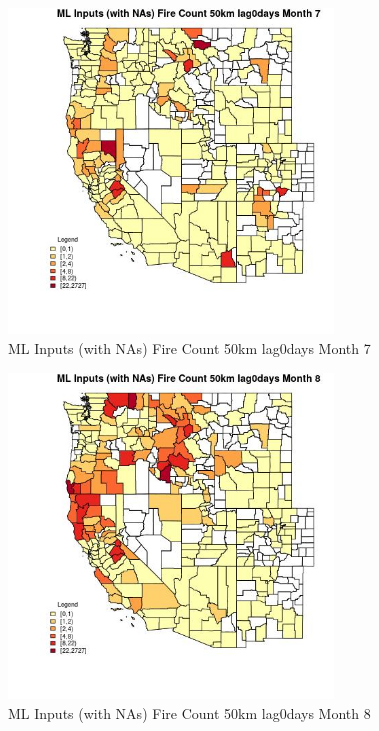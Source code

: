 \begin{figure} 
\centering  
\includegraphics[width=0.77\textwidth]{Code_Outputs/Report_ML_input_PM25_Step4_part_f_de_duplicated_aves_prioritize_24hr_obswNAs_CountyFire_Count_50km_lag0daysmedianMonth7.jpg} 
\caption{\label{fig:Report_ML_input_PM25_Step4_part_f_de_duplicated_aves_prioritize_24hr_obswNAsCountyFire_Count_50km_lag0daysmedianMonth7}ML Inputs (with NAs) Fire Count 50km lag0days Month 7} 
\end{figure} 
 

\begin{figure} 
\centering  
\includegraphics[width=0.77\textwidth]{Code_Outputs/Report_ML_input_PM25_Step4_part_f_de_duplicated_aves_prioritize_24hr_obswNAs_CountyFire_Count_50km_lag0daysmedianMonth8.jpg} 
\caption{\label{fig:Report_ML_input_PM25_Step4_part_f_de_duplicated_aves_prioritize_24hr_obswNAsCountyFire_Count_50km_lag0daysmedianMonth8}ML Inputs (with NAs) Fire Count 50km lag0days Month 8} 
\end{figure} 
 


